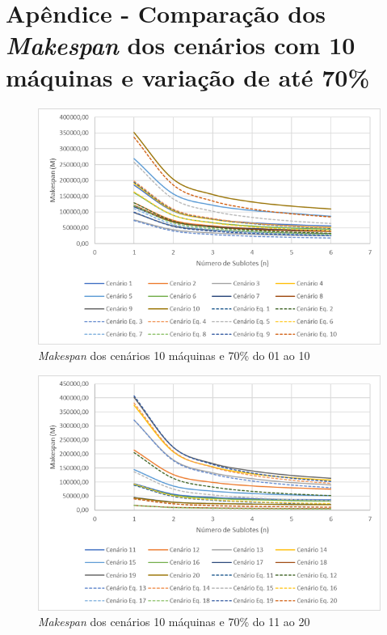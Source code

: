 \newpage
\section{Apêndice - Comparação dos \textit{Makespan} dos cenários com 10 máquinas e variação de até 70\%}\label{app:fig10machine70}

\begin{figure}[H]
    \centering
     \includegraphics[width=13cm]{Apendices/Figuras/10m70_01-10.png}
     \caption{\textit{Makespan} dos cenários 10 máquinas e 70\% do 01 ao 10}
    \label{fig:10m70_01-10}
\end{figure}

\begin{figure}[H]
    \centering
     \includegraphics[width=13cm]{Apendices/Figuras/10m70_11-20.png}
     \caption{\textit{Makespan} dos cenários 10 máquinas e 70\% do 11 ao 20}
    \label{fig:10m70_11-20}
\end{figure}

